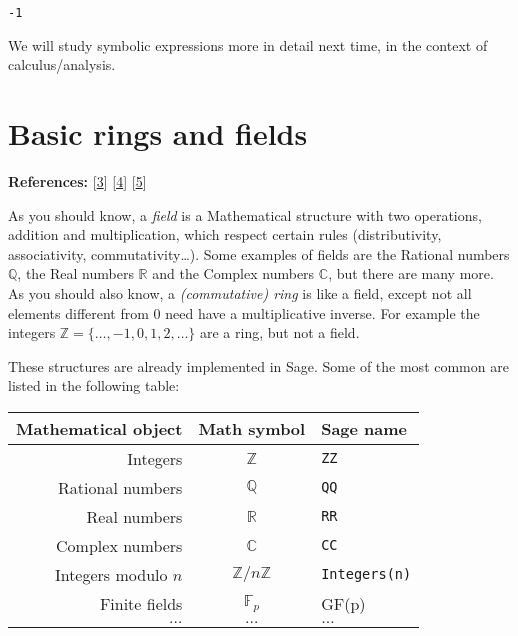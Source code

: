 \documentclass[11pt]{article}
\makeatletter
\newcommand{\boxspacing}{\kern\kvtcb@left@rule\kern\kvtcb@boxsep}
\newcommand{\prompt}[4]{
        \ttfamily\llap{{\color{#2}[#3]:\hspace{3pt}#4}}\vspace{-\baselineskip}
    }
\makeatother
\begin{document}
            \begin{tcolorbox}[breakable, size=fbox, boxrule=.5pt, pad at break*=1mm, opacityfill=0]
\prompt{Out}{outcolor}{17}{\boxspacing}
\begin{Verbatim}[commandchars=\\\{\}]
-1
\end{Verbatim}
\end{tcolorbox}
        
    We will study symbolic expressions more in detail next time, in the
context of calculus/analysis.

    \hypertarget{basic-rings-and-fields}{%
\section{Basic rings and fields}\label{basic-rings-and-fields}}

\textbf{References:}
{[}\href{https://doc.sagemath.org/html/en/reference/rings_standard/index.html}{3}{]}
{[}\href{https://doc.sagemath.org/html/en/reference/rings_numerical/index.html}{4}{]}
{[}\href{https://doc.sagemath.org/html/en/reference/finite_rings/index.html}{5}{]}

As you should know, a \emph{field} is a Mathematical structure with two
operations, addition and multiplication, which respect certain rules
(distributivity, associativity, commutativity\ldots). Some examples of
fields are the Rational numbers \(\mathbb Q\), the Real numbers
\(\mathbb R\) and the Complex numbers \(\mathbb C\), but there are many
more. As you should also know, a \emph{(commutative) ring} is like a
field, except not all elements different from \(0\) need have a
multiplicative inverse. For example the integers
\(\mathbb Z = \{ \dots, -1, 0, 1, 2, \dots\}\) are a ring, but not a
field.

These structures are already implemented in Sage. Some of the most
common are listed in the following table:

\begin{longtable}[]{@{}rcl@{}}
\toprule
Mathematical object & Math symbol & Sage name \\
\midrule
\endhead
Integers & \(\mathbb Z\) & \texttt{ZZ} \\
Rational numbers & \(\mathbb Q\) & \texttt{QQ} \\
Real numbers & \(\mathbb R\) & \texttt{RR} \\
Complex numbers & \(\mathbb C\) & \texttt{CC} \\
Integers modulo \(n\) & \(\mathbb Z/n\mathbb Z\) &
\texttt{Integers(n)} \\
Finite fields & \(\mathbb F_p\) & GF(p) \\
\(\dots\) & \(\dots\) & \(\dots\) \\
\bottomrule
\end{longtable}
\end{document}
